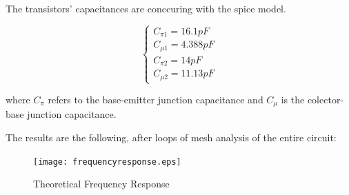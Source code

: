 The transistors' capacitances are conccuring with the spice model.

\begin{equation}
 \begin{cases}
  C_{\pi 1}=16.1pF\\
  C_{\mu 1}=4.388pF\\
  C_{\pi 2}=14pF\\
  C_{\mu 2}=11.13pF
 \end{cases}
\end{equation}

where $C_{\pi}$ refers to the base-emitter junction capacitance and $C_{\mu}$ is the colector-base junction capacitance.

The results are the following, after loops of mesh analysis of the entire circuit:

 \begin{figure}[h] \centering
\texttt{[image: frequencyresponse.eps]}
\vspace{-5mm}
\caption{Theoretical Frequency Response}\label{fig:rc}
\end{figure}


\newpage
